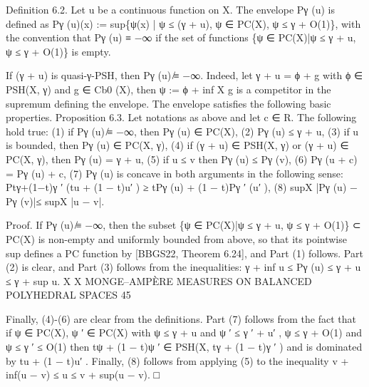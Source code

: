 \documentclass[
  11pt,
]{article}
\newenvironment{Shaded}{}{}
\newcommand{\NormalTok}[1]{#1}
\begin{document}
\begin{Shaded}
\begin{Highlighting}[]
\NormalTok{Definition 6.2. Let u be a continuous function on X. The envelope Pγ (u) is defined as}
\NormalTok{                   Pγ (u)(x) := sup\{ψ(x) | ψ ≤ (γ + u), ψ ∈ PC(X), ψ ≤ γ + O(1)\},}
\NormalTok{with the convention that Pγ (u) ≡ −∞ if the set of functions \{ψ ∈ PC(X)|ψ ≤ γ + u, ψ ≤ γ + O(1)\}}
\NormalTok{is empty.}

\NormalTok{   If (γ + u) is quasi{-}γ{-}PSH, then Pγ (u) ̸≡ −∞. Indeed, let γ + u = ϕ + g with ϕ ∈ PSH(X, γ) and}
\NormalTok{g ∈ Cb0 (X), then ψ := ϕ + inf X g is a competitor in the supremum defining the envelope.}
\NormalTok{     The envelope satisfies the following basic properties.}
\NormalTok{Proposition 6.3. Let notations as above and let c ∈ R. The following hold true:}
\NormalTok{     (1) if Pγ (u) ̸≡ −∞, then Pγ (u) ∈ PC(X),}
\NormalTok{     (2) Pγ (u) ≤ γ + u,}
\NormalTok{     (3) if u is bounded, then Pγ (u) ∈ PC(X, γ),}
\NormalTok{     (4) if (γ + u) ∈ PSH(X, γ) or (γ + u) ∈ PC(X, γ), then Pγ (u) = γ + u,}
\NormalTok{     (5) if u ≤ v then Pγ (u) ≤ Pγ (v),}
\NormalTok{     (6) Pγ (u + c) = Pγ (u) + c,}
\NormalTok{     (7) Pγ (u) is concave in both arguments in the following sense:}
\NormalTok{                         Ptγ+(1−t)γ ′ (tu + (1 − t)u′ ) ≥ tPγ (u) + (1 − t)Pγ ′ (u′ ),}
\NormalTok{     (8) supX |Pγ (u) − Pγ (v)|≤ supX |u − v|.}

\NormalTok{Proof. If Pγ (u) ̸≡ −∞, then the subset \{ψ ∈ PC(X)|ψ ≤ γ + u, ψ ≤ γ + O(1)\} ⊂ PC(X) is}
\NormalTok{non{-}empty and uniformly bounded from above, so that its pointwise sup defines a PC function by}
\NormalTok{[BBGS22, Theorem 6.24], and Part (1) follows. Part (2) is clear, and Part (3) follows from the}
\NormalTok{inequalities:}
\NormalTok{                            γ + inf u ≤ Pγ (u) ≤ γ + u ≤ γ + sup u.}
\NormalTok{                                      X                                 X}
\NormalTok{                   MONGE–AMPÈRE MEASURES ON BALANCED POLYHEDRAL SPACES                                45}


\NormalTok{Finally, (4){-}(6) are clear from the definitions. Part (7) follows from the fact that if ψ ∈ PC(X),}
\NormalTok{ψ ′ ∈ PC(X) with ψ ≤ γ + u and ψ ′ ≤ γ ′ + u′ , ψ ≤ γ + O(1) and ψ ≤ γ ′ ≤ O(1) then}
\NormalTok{                               tψ + (1 − t)ψ ′ ∈ PSH(X, tγ + (1 − t)γ ′ )}
\NormalTok{and is dominated by tu + (1 − t)u′ . Finally, (8) follows from applying (5) to the inequality v +}
\NormalTok{inf(u − v) ≤ u ≤ v + sup(u − v).                                                                □}
\end{Highlighting}
\end{Shaded}
\end{document}
